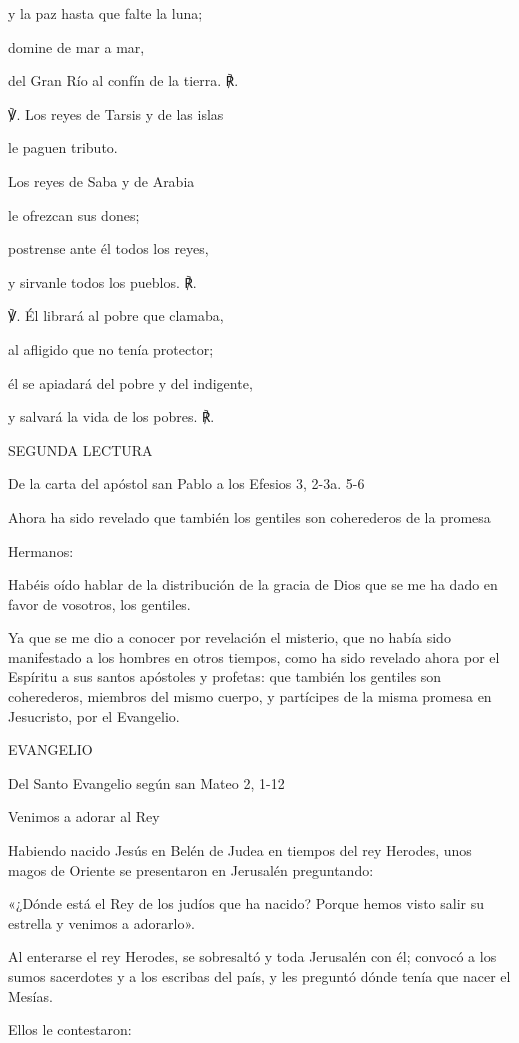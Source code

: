 \begin{body}
\begin{body}
y la paz hasta que falte la luna;

domine de mar a mar,

del Gran Río al confín de la tierra. ℟.

℣. Los reyes de Tarsis y de las islas

le paguen tributo.

Los reyes de Saba y de Arabia

le ofrezcan sus dones;

postrense ante él todos los reyes,

y sirvanle todos los pueblos. ℟.

℣. Él librará al pobre que clamaba,

al afligido que no tenía protector;

él se apiadará del pobre y del indigente,

y salvará la vida de los pobres. ℟.

SEGUNDA LECTURA

De la carta del apóstol san Pablo a los Efesios 3, 2-3a. 5-6

Ahora ha sido revelado que también los gentiles son coherederos de la
promesa

Hermanos:

Habéis oído hablar de la distribución de la gracia de Dios que se me ha
dado en favor de vosotros, los gentiles.

Ya que se me dio a conocer por revelación el misterio, que no había sido
manifestado a los hombres en otros tiempos, como ha sido revelado ahora
por el Espíritu a sus santos apóstoles y profetas: que también los
gentiles son coherederos, miembros del mismo cuerpo, y partícipes de la
misma promesa en Jesucristo, por el Evangelio.

EVANGELIO

Del Santo Evangelio según san Mateo 2, 1-12

Venimos a adorar al Rey

Habiendo nacido Jesús en Belén de Judea en tiempos del rey Herodes, unos
magos de Oriente se presentaron en Jerusalén preguntando:

«¿Dónde está el Rey de los judíos que ha nacido? Porque hemos visto
salir su estrella y venimos a adorarlo».

Al enterarse el rey Herodes, se sobresaltó y toda Jerusalén con él;
convocó a los sumos sacerdotes y a los escribas del país, y les preguntó
dónde tenía que nacer el Mesías.

Ellos le contestaron:


\end{body}
\end{body}
